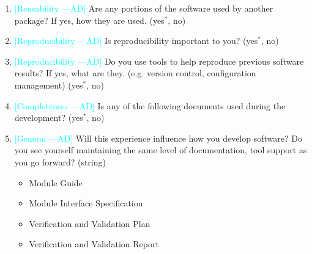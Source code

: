 \documentclass[12pt]{article}
\newcommand{\authornote}[3]{\textcolor{#1}{[#3 ---#2]}}
\newcommand{\authornote}[3]{}
\newcommand{\ad}[1]{\authornote{cyan}{AD}{#1}} %
\begin{document}
\begin{enumerate}
\item \ad{Reusability} Are any portions of the software used by another package?
If yes, how they are used. ({yes$^*$, no})
\item \ad{Reproducibility} Is reproducibility important to you? ({yes$^*$, no})
\item \ad{Reproducibility} Do you use tools to help reproduce previous software
results? If yes, what are they. (e.g. version control, configuration management)
({yes$^*$, no})
\item \ad{Completeness} Is any of the following documents used during the
development? ({yes$^*$, no})
\item \ad{General} Will this experience influence how you develop software? Do
you see yourself maintaining the same level of documentation, tool support as
you go forward? (string)
\begin{itemize}
\item Module Guide
\item Module Interface Specification
\item Verification and Validation Plan
\item Verification and Validation Report
\end{itemize}
\end{enumerate}
\end{document}
